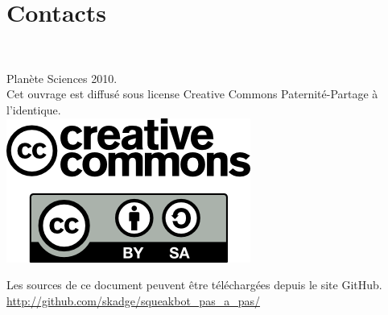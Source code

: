 \documentclass[a4paper,12pt]{book}
\begin{document}
\section{Contacts}

\printglossaries

\clearpage
~
\vfill
\begin{center}
	Planète Sciences 2010.\\
	Cet ouvrage est diffusé sous license Creative Commons Paternité-Partage à l'identique.\\
	\includegraphics[scale=0.5]{logo_cc.png}
\end{center}

\vfill

\begin{center}
	Les sources de ce document peuvent être téléchargées depuis le site GitHub.
	\url{http://github.com/skadge/squeakbot_pas_a_pas/}
\end{center}

\vfill
\end{document}
